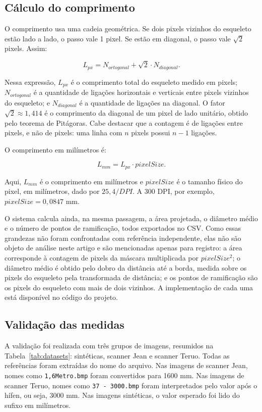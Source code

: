 \documentclass[12pt]{article}
\begin{document}
\subsection{Cálculo do comprimento}

O comprimento usa uma cadeia geométrica. Se dois pixels vizinhos do esqueleto estão lado a lado, o passo vale 1 pixel. Se estão em diagonal, o passo vale $\sqrt{2}$ pixels. Assim:

\[
L_{px} = N_{ortogonal} + \sqrt{2}\cdot N_{diagonal}.
\]

Nessa expressão, $L_{px}$ é o comprimento total do esqueleto medido em pixels; $N_{ortogonal}$ é a quantidade de ligações horizontais e verticais entre pixels vizinhos do esqueleto; e $N_{diagonal}$ é a quantidade de ligações na diagonal. O fator $\sqrt{2} \approx 1{,}414$ é o comprimento da diagonal de um pixel de lado unitário, obtido pelo teorema de Pitágoras. Cabe destacar que a contagem é de ligações entre pixels, e não de pixels: uma linha com $n$ pixels possui $n-1$ ligações.

O comprimento em milímetros é:

\[
L_{mm} = L_{px}\cdot pixelSize.
\]

Aqui, $L_{mm}$ é o comprimento em milímetros e $pixelSize$ é o tamanho físico do pixel, em milímetros, dado por $25,4/DPI$. A 300 DPI, por exemplo, $pixelSize = 0{,}0847$ mm.

O sistema calcula ainda, na mesma passagem, a área projetada, o diâmetro médio e o número de pontos de ramificação, todos exportados no CSV. Como essas grandezas não foram confrontadas com referência independente, elas não são objeto de análise neste artigo e são mencionadas apenas para registro: a área corresponde à contagem de pixels da máscara multiplicada por $pixelSize^2$; o diâmetro médio é obtido pelo dobro da distância até a borda, medida sobre os pixels do esqueleto pela transformada de distância; e os pontos de ramificação são os pixels do esqueleto com mais de dois vizinhos. A implementação de cada uma está disponível no código do projeto.

\subsection{Validação das medidas}
\label{sec:validacao}

A validação foi realizada com três grupos de imagens, resumidos na Tabela~\ref{tab:datasets}: sintéticas, scanner Jean e scanner Teruo. Todas as referências foram extraídas do nome do arquivo. Nas imagens de scanner Jean, nomes como \texttt{1,6Metro.bmp} foram convertidos para 1600 mm. Nas imagens de scanner Teruo, nomes como \texttt{37 - 3000.bmp} foram interpretados pelo valor após o hífen, ou seja, 3000 mm. Nas imagens sintéticas, o valor esperado foi lido do sufixo em milímetros.
\end{document}
